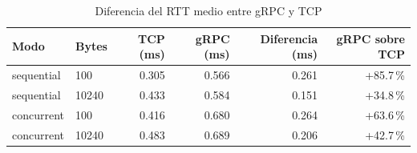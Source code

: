\begin{table}[htbp]
\centering
\caption{Diferencia del RTT medio entre gRPC y TCP}
\label{tab:dif-latencia}
\begin{tabular}{llrrrr}
\toprule
Modo & Bytes & TCP (ms) & gRPC (ms) & Diferencia (ms) & gRPC sobre TCP \\
\midrule
sequential & 100 & 0.305 & 0.566 & 0.261 & +85.7\,\% \\
sequential & 10240 & 0.433 & 0.584 & 0.151 & +34.8\,\% \\
concurrent & 100 & 0.416 & 0.680 & 0.264 & +63.6\,\% \\
concurrent & 10240 & 0.483 & 0.689 & 0.206 & +42.7\,\% \\
\bottomrule
\end{tabular}
\end{table}
